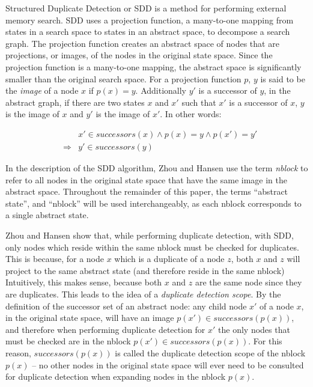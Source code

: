 \documentclass{article}
\begin{document}
Structured Duplicate Detection or SDD \cite{zhou:sdd} is a method for
performing external memory search.  SDD uses a projection function, a
many-to-one mapping from states in a search space to states in an
abstract space, to decompose a search graph.  The projection function
creates an abstract space of nodes that are projections, or images, of
the nodes in the original state space.  Since the projection function
is a many-to-one mapping, the abstract space is significantly smaller
than the original search space.  For a projection function $p$, $y$ is
said to be the \emph{image} of a node $x$ if $p(x) = y$.  Additionally
$y'$ is a successor of $y$, in the abstract graph, if there are two
states $x$ and $x'$ such that $x'$ is a successor of $x$, $y$ is the
image of $x$ and $y'$ is the image of $x'$.  In other words:

\begin{eqnarray*}
  &&x' \in successors(x) \wedge p(x) = y \wedge p(x') = y' \\
  &\Rightarrow& y' \in successors(y)
\end{eqnarray*}

In the description of the SDD algorithm, Zhou and Hansen use the term
\emph{nblock} to refer to all nodes in the original state space that
have the same image in the abstract space.  Throughout the remainder
of this paper, the terms ``abstract state'', and ``nblock'' will be
used interchangeably, as each nblock corresponds to a single abstract
state.

Zhou and Hansen show that, while performing duplicate detection, with
SDD, only nodes which reside within the same nblock must be checked
for duplicates.  This is because, for a node $x$ which is a duplicate
of a node $z$, both $x$ and $z$ will project to the same abstract
state (and therefore reside in the same nblock) Intuitively, this
makes sense, because both $x$ and $z$ are the same node since they are
duplicates.  This leads to the idea of a \emph{duplicate detection
  scope}.  By the definition of the successor set of an abstract node:
any child node $x'$ of a node $x$, in the original state space, will
have an image $p(x') \in successors(p(x))$, and therefore when
performing duplicate detection for $x'$ the only nodes that must be
checked are in the nblock $p(x') \in successors(p(x))$.  For this
reason, $successors(p(x))$ is called the duplicate detection scope of
the nblock $p(x)$ -- no other nodes in the original state space will
ever need to be consulted for duplicate detection when expanding nodes
in the nblock $p(x)$.
\end{document}
